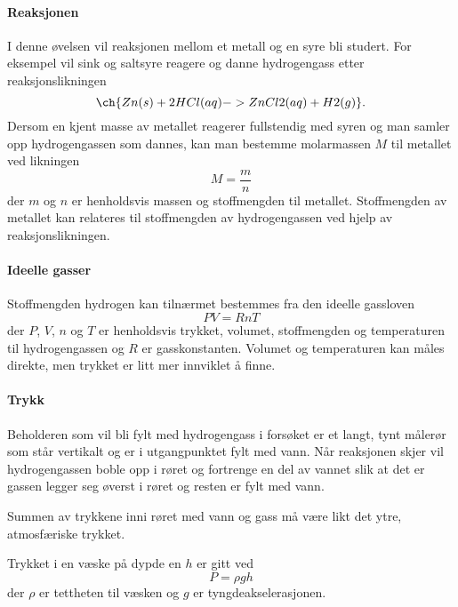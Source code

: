 	\paragraph{Reaksjonen}
	I denne øvelsen vil reaksjonen mellom et metall og en syre bli studert. For eksempel vil sink og saltsyre reagere og danne hydrogengass etter reaksjonslikningen
	\begin{equation*}
		\ch{Zn (s) + 2 HCl (aq) -> ZnCl2 (aq) + H2 (g)}.
	\end{equation*}
	Dersom en kjent masse av metallet reagerer fullstendig med syren og man samler opp hydrogengassen som dannes, kan man bestemme molarmassen $M$ til metallet ved likningen
	\begin{equation*}
		M = \frac{m}{n}
	\end{equation*}
	der $m$ og $n$ er henholdsvis massen og stoffmengden til metallet. Stoffmengden av metallet kan relateres til stoffmengden av hydrogengassen ved hjelp av reaksjonslikningen. 
	
	\paragraph{Ideelle gasser}
	Stoffmengden hydrogen kan tilnærmet bestemmes fra den ideelle gassloven
	\begin{equation*}
		PV = RnT
	\end{equation*}
	der $P$, $V$, $n$ og $T$ er henholdsvis trykket, volumet, stoffmengden og temperaturen til hydrogengassen og $R$ er gasskonstanten. Volumet og temperaturen kan måles direkte, men trykket er litt mer innviklet å finne. 
	
	\paragraph{Trykk}
	Beholderen som vil bli fylt med hydrogengass i forsøket er et langt, tynt målerør som står vertikalt og er i utgangpunktet fylt med vann. Når reaksjonen skjer vil hydrogengassen boble opp i røret og fortrenge en del av vannet slik at det er gassen legger seg øverst i røret og resten er fylt med vann. 
	
	Summen av trykkene inni røret med vann og gass må være likt det ytre, atmosfæriske trykket. 
	
	Trykket i en væske på dypde en $h$ er gitt ved 
	\begin{equation}
		P=\rho gh \label{eq:rgh}
	\end{equation}
	der $\rho$ er tettheten til væsken og $g$ er tyngdeakselerasjonen.
	
